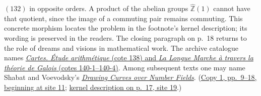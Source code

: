 \documentclass[11pt,a4paper]{article}
\begin{document}
$(132)$ in opposite orders. A product of the abelian groups
$\hat{\mathbb Z}(1)$ cannot have that quotient, since the image of a
commuting pair remains commuting. This concrete morphism locates the
problem in the footnote's kernel description; its wording is preserved
in the readers. The closing paragraph on p.~18 returns to the role of
dreams and visions in mathematical work. The archive catalogue names
\href{https://grothendieck.umontpellier.fr/archives-grothendieck/}{\emph{Cartes. Étude arithmétique} (cote 138) and \emph{La Longue Marche à travers la théorie de Galois} (cotes 140-1--140-4)}.
Among subsequent texts one may
name Shabat and Voevodsky's
\href{https://www.math.ias.edu/vladimir/node/79}{\emph{Drawing Curves over Number Fields}}.
(\href{https://grothendieck.umontpellier.fr/web/viewer.html?file=../119.pdf\#page=12}{Copy 1, pp.~9--18, beginning at site 11};
\href{https://grothendieck.umontpellier.fr/web/viewer.html?file=../119.pdf\#page=20}{kernel description on p.~17, site 19}.)
\end{document}
